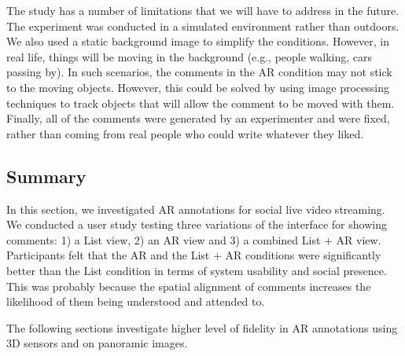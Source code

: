 The study has a number of limitations that we will have to address in the future. The experiment was conducted in a simulated environment rather than outdoors. We also used a static background image to simplify the conditions. However, in real life, things will be moving in the background (e.g., people walking, cars passing by). In such scenarios, the comments in the AR condition may not stick to the moving objects. However, this could be solved by using image processing techniques to track objects that will allow the comment to be moved with them. Finally, all of the comments were generated by an experimenter and were fixed, rather than coming from real people who could write whatever they liked.    

\subsection{Summary}

In this section, we investigated AR annotations for social live video streaming. We conducted a user study testing three variations of the interface for showing comments: 1) a List view, 2) an AR view and 3) a combined List + AR view. Participants felt that the AR and the List + AR conditions were significantly better than the List condition in terms of system usability and social presence. This was probably because the spatial alignment of comments increases the likelihood of them being understood and attended to.


The following sections investigate higher level of fidelity in AR annotations using 3D sensors and on panoramic images. 